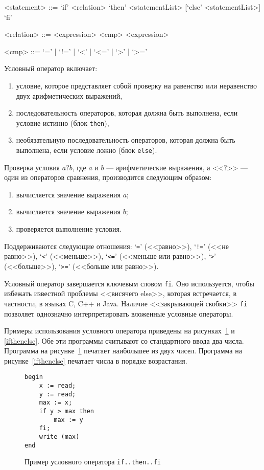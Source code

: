 \documentclass[a4paper,12pt]{article}
\begin{document}
\begin{grammar}
<statement> ::= `if' <relation> `then' <statementList> [`else' <statementList>] `fi'

<relation> ::= <expression> <cmp> <expression>

<cmp> ::= `=' | `!=' | `<' | `<=' | `>' | `>='
\end{grammar}

Условный оператор включает:
\begin{enumerate}
\item условие, которое представляет собой проверку на равенство или неравенство
двух арифметических выражений,
\item последовательность операторов, которая должна быть выполнена, если условие
истинно (блок \texttt{then}),
\item необязательную последовательность операторов, которая должна быть
выполнена, если условие ложно (блок \texttt{else}).
\end{enumerate}

Проверка условия $a ? b$, где $a$ и $b$ --- арифметические выражения, а <<$?$>>
--- один из операторов сравнения, производится следующим образом:
\begin{enumerate}
\item вычисляется значение выражения $a$;
\item вычисляется значение выражения $b$;
\item проверяется выполнение условия.
\end{enumerate}

Поддерживаются следующие отношения: `\texttt{=}' (<<равно>>), `\texttt{!=}'
(<<не равно>>), `\texttt{<}' (<<меньше>>), `\texttt{<=}' (<<меньше или равно>>),
`\texttt{>}' (<<больше>>), `\texttt{>=}' (<<больше или равно>>).

Условный оператор завершается ключевым словом \texttt{fi}. Оно используется,
чтобы избежать известной проблемы <<висячего else>>, которая встречается, в
частности, в языках C, C++ и Java. Наличие <<закрывающей скобки>> \texttt{fi}
позволяет однозначно интерпретировать вложенные условные операторы.

Примеры использования условного оператора приведены на рисунках~\ref{ifthen} и
\ref{ifthenelse}. Обе эти программы считывают со стандартного ввода два числа.
Программа на рисунке~\ref{ifthen} печатает наибольшее из двух чисел. Программа
на рисунке~\ref{ifthenelse} печатает числа в порядке возрастания.

\begin{figure}
\begin{lstlisting}
begin
    x := read;
    y := read;
    max := x;
    if y > max then
        max := y
    fi;
    write (max)
end
\end{lstlisting}
\label{ifthen}
\caption{Пример условного оператора \texttt{if..then..fi}}
\end{figure}
\end{document}
